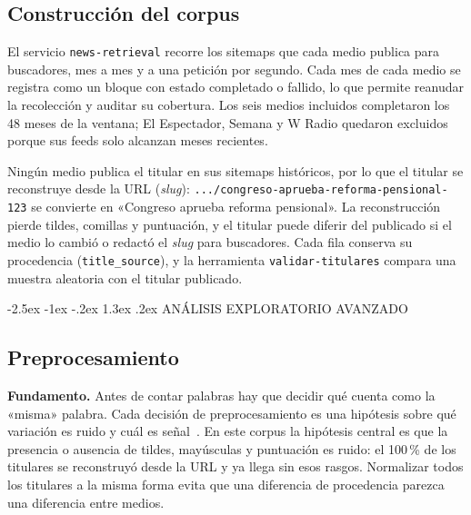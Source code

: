 \documentclass[10pt,twocolumn]{article}
\makeatletter
\renewcommand{\section}{\@startsection{section}{1}{\z@}%
  {-2.5ex \@plus -1ex \@minus -.2ex}%
  {1.3ex \@plus .2ex}%
  {\normalfont\large\bfseries\centering}}
\makeatother
\begin{document}
\subsection{Construcción del corpus}

El servicio \texttt{news-retrieval} recorre los sitemaps que cada medio publica
para buscadores, mes a mes y a una petición por segundo. Cada mes de cada medio
se registra como un bloque con estado completado o fallido, lo que permite
reanudar la recolección y auditar su cobertura. Los seis medios incluidos
completaron los 48 meses de la ventana; El Espectador, Semana y W Radio quedaron
excluidos porque sus feeds solo alcanzan meses recientes.

Ningún medio publica el titular en sus sitemaps históricos, por lo que el
titular se reconstruye desde la URL (\textit{slug}):
\texttt{.../congreso-aprueba-reforma-pensional-123} se convierte en
«Congreso aprueba reforma pensional». La reconstrucción pierde tildes, comillas
y puntuación, y el titular puede diferir del publicado si el medio lo cambió o
redactó el \textit{slug} para buscadores. Cada fila conserva su procedencia
(\texttt{title\_source}), y la herramienta \texttt{validar-titulares} compara una
muestra aleatoria con el titular publicado.

\section{ANÁLISIS EXPLORATORIO AVANZADO}

\subsection{Preprocesamiento}

\textbf{Fundamento.} Antes de contar palabras hay que decidir qué cuenta como
la «misma» palabra. Cada decisión de preprocesamiento es una hipótesis sobre
qué variación es ruido y cuál es señal~\cite{manning2008}. En este corpus la
hipótesis central es que la presencia o ausencia de tildes, mayúsculas y
puntuación es ruido: el 100\,\% de los titulares se reconstruyó desde la URL y
ya llega sin esos rasgos. Normalizar todos los titulares a la misma forma
evita que una diferencia de procedencia parezca una diferencia entre medios.
\end{document}
